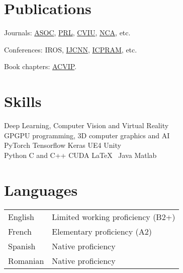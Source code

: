 \documentclass[]{deedy-resume-openfont}
\begin{document}
\begin{minipage}[t]{0.495\textwidth}
\section{Publications}
\vspace{\topsep}
\begin{tightemize}
\item Journals: \href{https://www.sciencedirect.com/science/article/pii/S1568494618302813}{ ASOC}, \href{http://www.sciencedirect.com/science/article/pii/S0167865517301903}{ PRL}, \href{http://www.sciencedirect.com/science/article/pii/S1077314217301182}{ CVIU},  \href{https://link.springer.com/article/10.1007/s00521-016-2224-9}{ NCA}, etc. 	
\item Conferences: IROS, \href{https://ieeexplore.ieee.org/document/7965885}{ IJCNN}, \href{http://www.scitepress.org/PublicationsDetail.aspx?ID=iZhu5TbsCgU=&t=1}{ ICPRAM}, etc. 
\item Book chapters: \href{https://www.igi-global.com/chapter/object-recognition-pipeline/201780}{ ACVIP}.
\end{tightemize}

\section{Skills}
Deep Learning, Computer Vision and Virtual Reality \\
\sectionsep
{}
GPGPU programming, 3D computer graphics and AI \\
\sectionsep
{}
PyTorch \textbullet{} Tensorflow \textbullet{} Keras \textbullet{} UE4 \textbullet{} Unity \\
\sectionsep
{}
Python \textbullet{} C and C++ \textbullet{} CUDA \textbullet{} \LaTeX\ \textbullet{} Java \textbullet{} Matlab \\


\section{Languages}
\begin{tabular}{ll}
English & Limited working proficiency (B2+)\\
French & Elementary proficiency (A2) \\
Spanish & Native proficiency \\ 
Romanian & Native proficiency\\ 
\end{tabular}

\end{minipage} 
\end{document}
